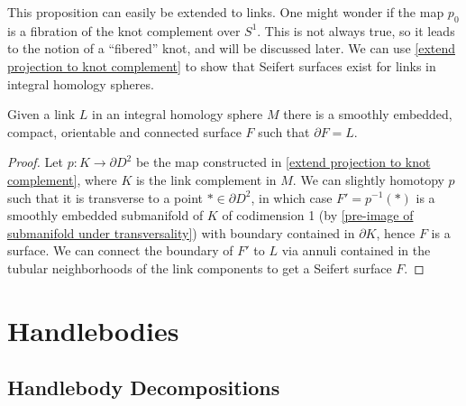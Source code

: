 {This proposition can easily be extended to links. One might wonder if the map $p_0$ is a fibration of the knot complement over $S^1$. This is not always true, so it leads to the notion of a ``fibered'' knot, and will be discussed later. We can use \cref{extend projection to knot complement} to show that Seifert surfaces exist for links in integral homology spheres.

\begin{prop}
Given a link $L$ in an integral homology sphere $M$ there is a smoothly embedded, compact, orientable and connected surface $F$ such that $\partial F = L$.
\end{prop}
\begin{proof}
Let $p : K \rightarrow \partial D^2$ be the map constructed in \cref{extend projection to knot complement}, where $K$ is the link complement in $M$. We can slightly homotopy $p$ such that it is transverse to a point $* \in \partial D^2$, in which case $F' = p^{-1}(*)$ is a smoothly embedded submanifold of $K$ of codimension 1 (by \cref{pre-image of submanifold under transversality}) with boundary contained in $\partial K$, hence $F$ is a surface. We can connect the boundary of $F'$ to $L$ via annuli contained in the tubular neighborhoods of the link components to get a Seifert surface $F$.
\end{proof}
}











\newpage
\section{Handlebodies}
\label{Handlebodies}



\subsection{Handlebody Decompositions}
\label{Handlebody Decompositions}



